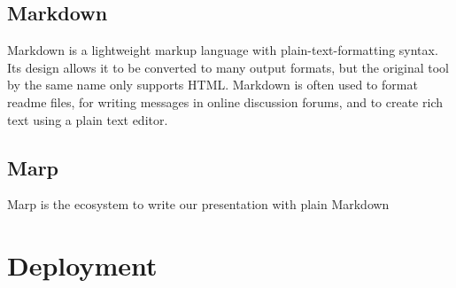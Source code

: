 \subsection{Markdown}
Markdown is a lightweight markup language with plain-text-formatting syntax. Its design allows it to be converted to many output formats, but the original tool by the same name only supports HTML. Markdown is often used to format readme files, for writing messages in online discussion forums, and to create rich text using a plain text editor.
\subsection{Marp}
Marp is the ecosystem to write our presentation with plain Markdown
\section{Deployment}


